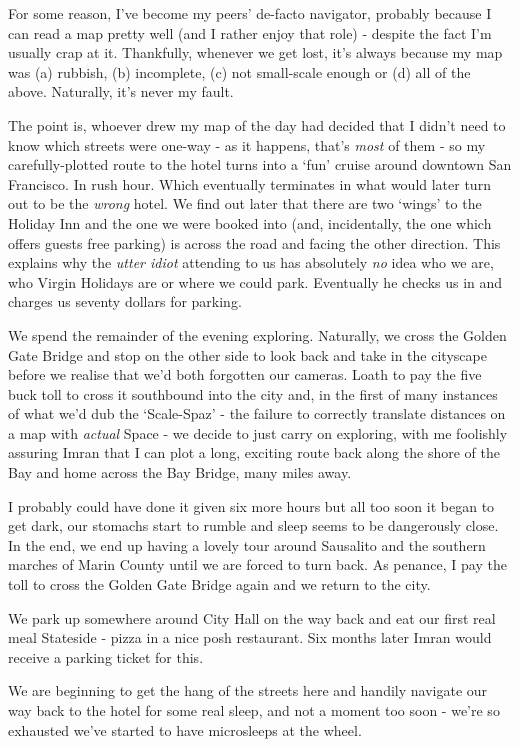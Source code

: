 \documentclass[a5paper,titlepage,11pt]{book}
\begin{document}
For some reason, I've become my peers' de-facto navigator, probably because I can read a map pretty well (and I rather enjoy that role) - despite the fact I'm usually crap at it. Thankfully, whenever we get lost, it's always because my map was (a) rubbish, (b) incomplete, (c) not small-scale enough or (d) all of the above. Naturally, it's never my fault.

The point is, whoever drew my map of the day had decided that I didn't need to know which streets were one-way - as it happens, that's \emph{most} of them - so my carefully-plotted route to the hotel turns into a `fun' cruise around downtown San Francisco. In rush hour. Which eventually terminates in what would later turn out to be the \emph{wrong} hotel. We find out later that there are two `wings' to the Holiday Inn and the one we were booked into (and, incidentally, the one which offers guests free parking) is across the road and facing the other direction. This explains why the \emph{utter idiot} attending to us has absolutely \emph{no} idea who we are, who Virgin Holidays are or where we could park. Eventually he checks us in and charges us seventy dollars for parking. 

We spend the remainder of the evening exploring. Naturally, we cross the Golden Gate Bridge and stop on the other side to look back and take in the cityscape before we realise that we'd both forgotten our cameras. Loath to pay the five buck toll to cross it southbound into the city and, in the first of many instances of what we'd dub the `Scale-Spaz' - the failure to correctly translate distances on a map with \emph{actual} Space - we decide to just carry on exploring, with me foolishly assuring Imran that I can plot a long, exciting route back along the shore of the Bay and home across the Bay Bridge, many miles away.

I probably could have done it given six more hours but all too soon it began to get dark, our stomachs start to rumble and sleep seems to be dangerously close. In the end, we end up having a lovely tour around Sausalito and the southern marches of Marin County until we are forced to turn back. As penance, I pay the toll to cross the Golden Gate Bridge again and we return to the city.

We park up somewhere around City Hall on the way back and eat our first real meal Stateside - pizza in a nice posh restaurant. Six months later Imran would receive a parking ticket for this.

We are beginning to get the hang of the streets here and handily navigate our way back to the hotel for some real sleep, and not a moment too soon - we're so exhausted we've started to have microsleeps at the wheel.
\end{document}
